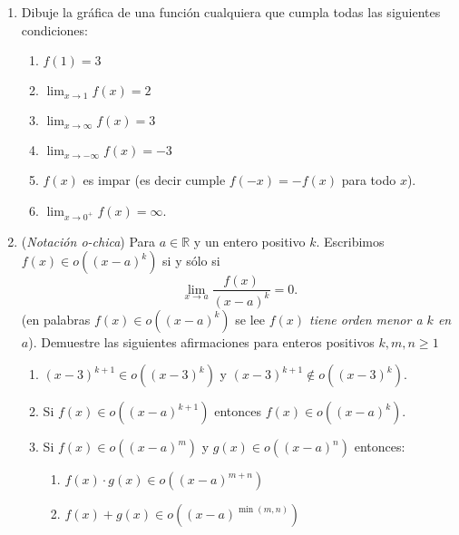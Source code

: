 \documentclass[12pt, a4paper]{article}
\begin{document}
\begin{enumerate}
\item Dibuje la gráfica de una función cualquiera que cumpla todas las siguientes condiciones:
\begin{enumerate}
\item $f(1)=3$
\item $\lim_{x\rightarrow 1} f(x)=2$
\item $\lim_{x\rightarrow \infty} f(x)=3$
\item $\lim_{x\rightarrow -\infty} f(x)=-3$
\item $f(x)$ es impar (es decir cumple $f(-x)=-f(x)$ para todo $x$).
\item $\lim_{x\rightarrow 0^{+}} f(x)=\infty$.
\end{enumerate}

\item (\emph{Notación o-chica}) Para $a\in \mathbb{R}$ y un entero positivo $k$. Escribimos $f(x)\in o\left((x-a)^k\right)$ si y sólo si 
\[\lim_{x\rightarrow a} \frac{f(x)}{(x-a)^k} = 0.\]
(en palabras $f(x)\in o\left((x-a)^k\right)$ se lee \emph{ $f(x)$ tiene orden menor a $k$ en $a$}).
Demuestre las siguientes afirmaciones para enteros positivos $k,m,n\geq 1$

\begin{enumerate}
\item  $(x-3)^{k+1}\in o((x-3)^{k})$ y $(x-3)^{k+1}\not\in o((x-3)^{k})$. 
\item  Si $f(x)\in o\left((x-a)^{k+1}\right)$ entonces $f(x)\in o\left((x-a)^{k}\right)$.
\item Si $f(x)\in o\left((x-a)^{m}\right)$ y $g(x)\in o\left((x-a)^{n}\right)$ entonces:
\begin{enumerate}
\item $f(x)\cdot g(x)\in o\left((x-a)^{m+n}\right)$

\item $f(x)+ g(x)\in o\left((x-a)^{\min(m,n)}\right)$
\end{enumerate}

\end{enumerate}


\end{enumerate}
\end{document}
